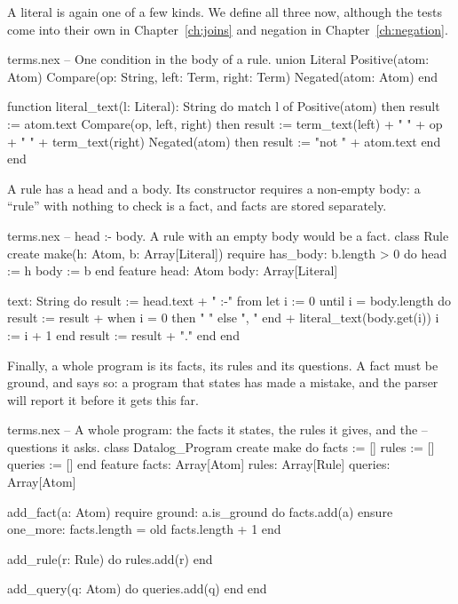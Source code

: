 A literal is again one of a few kinds. We define all three now, although
the tests come into their own in Chapter~\ref{ch:joins} and negation in
Chapter~\ref{ch:negation}.

\begin{continued}{terms.nex}
-- One condition in the body of a rule.
union Literal
  Positive(atom: Atom)
  Compare(op: String, left: Term, right: Term)
  Negated(atom: Atom)
end

function literal_text(l: Literal): String
do
  match l of
    Positive(atom) then result := atom.text
    Compare(op, left, right) then
      result := term_text(left) + " " + op + " " + term_text(right)
    Negated(atom) then result := "not " + atom.text
  end
end
\end{continued}

A rule has a head and a body. Its constructor requires a non-empty body:
a ``rule'' with nothing to check is a fact, and facts are stored
separately.

\begin{continued}{terms.nex}
-- head :- body. A rule with an empty body would be a fact.
class Rule
create
  make(h: Atom, b: Array[Literal])
  require
    has_body: b.length > 0
  do
    head := h
    body := b
  end
feature
  head: Atom
  body: Array[Literal]

  text: String
  do
    result := head.text + " :-"
    from let i := 0 until i = body.length do
      result := result + when i = 0 then " " else ", " end + literal_text(body.get(i))
      i := i + 1
    end
    result := result + "."
  end
end
\end{continued}

Finally, a whole program is its facts, its rules and its questions. A fact
must be ground, and  says so: a program that states
 has made a mistake, and the parser will report it
before it gets this far.

\begin{continued}{terms.nex}
-- A whole program: the facts it states, the rules it gives, and the
-- questions it asks.
class Datalog_Program
create
  make
  do
    facts := []
    rules := []
    queries := []
  end
feature
  facts: Array[Atom]
  rules: Array[Rule]
  queries: Array[Atom]

  add_fact(a: Atom)
  require
    ground: a.is_ground
  do
    facts.add(a)
  ensure
    one_more: facts.length = old facts.length + 1
  end

  add_rule(r: Rule)
  do
    rules.add(r)
  end

  add_query(q: Atom)
  do
    queries.add(q)
  end
end
\end{continued}


